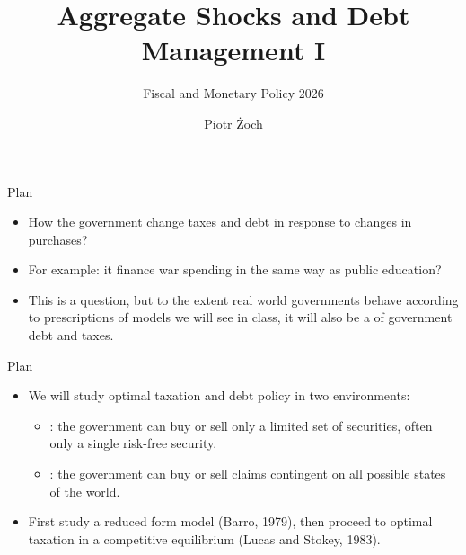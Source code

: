 \documentclass[11pt,xcolor={dvipsnames},aspectratio=159,hyperref={pdftex,pdfpagemode=UseNone,hidelinks,pdfdisplaydoctitle=true},usepdftitle=false]{beamer}
\begin{document}
\title{Aggregate Shocks and Debt Management I}
\subtitle{Fiscal and Monetary Policy 2026}

\author{Piotr Żoch}%
\frame{\titlepage}

\begin{frame}{Plan}
    \begin{itemize}
    \item How  the government change taxes and debt in response
    to changes in purchases?
    \item For example:  it finance war spending in the same way
    as public education?
    \item This is a  question, but to the extent real world
    governments behave according to prescriptions of models we will see
    in class, it will also be a  of government debt
    and taxes.
    \end{itemize}
\end{frame}



\begin{frame}{Plan}

    \begin{itemize}
    \item We will study optimal taxation and debt policy in two environments:
    \begin{itemize}
    \item {}: the government can buy or sell only a limited
    set of securities, often only a single risk-free security.
    \item {}: the government can buy or sell claims contingent
    on all possible states of the world.
    \end{itemize}
    \item First study a reduced form model (Barro, 1979), then proceed to optimal
    taxation in a competitive equilibrium (Lucas and Stokey, 1983).
    \end{itemize}
\end{frame}
    \begin{frame}
    \end{frame}
\end{document}
